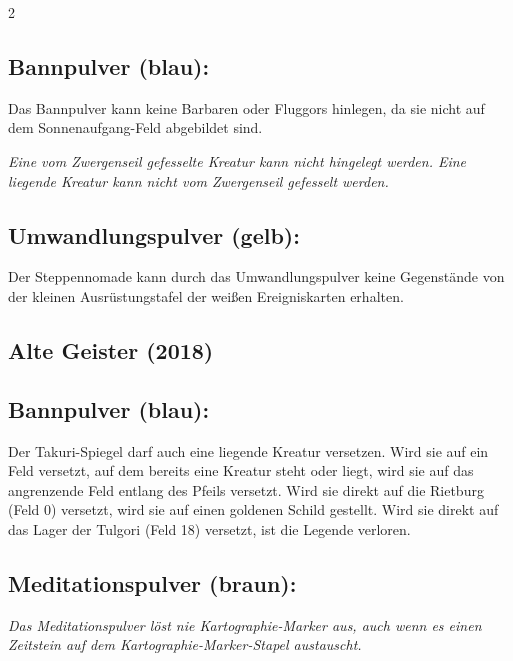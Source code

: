 \documentclass[10pt, a4paper, oneside]{book}
\newcommand{\fan}[1]{\textit{#1}}
\begin{document}
\begin{multicols*}{2}
\begin{bgcolor}[color-bb]
\subsection{Bannpulver (blau):}

Das Bannpulver kann keine Barbaren oder Fluggors hinlegen, da sie nicht auf dem Sonnenaufgang-Feld abgebildet sind.
\supercite{90058}

\fan{Eine vom Zwergenseil gefesselte Kreatur kann nicht hingelegt werden. Eine liegende Kreatur kann nicht vom Zwergenseil gefesselt werden.}


\subsection{Umwandlungspulver (gelb):}

Der Steppennomade kann durch das Umwandlungspulver keine Gegenstände von der kleinen Ausrüstungstafel der weißen Ereigniskarten erhalten.
\supercite{88659}

\end{bgcolor}



\begin{bgcolor}[color-ag]
\section{Alte Geister (2018)}




\subsection{Bannpulver (blau):}

Der Takuri-Spiegel darf auch eine liegende Kreatur versetzen. Wird sie auf ein Feld versetzt, auf dem bereits eine Kreatur steht oder liegt, wird sie auf das angrenzende Feld entlang des Pfeils versetzt. Wird sie direkt auf die Rietburg (Feld 0) versetzt, wird sie auf einen goldenen Schild gestellt. Wird sie direkt auf das Lager der Tulgori (Feld 18) versetzt, ist die Legende verloren.
\supercite{ag-begleitheft}



\subsection{Meditationspulver (braun):}

\fan{Das Meditationspulver löst nie Kartographie-Marker aus, auch wenn es einen Zeitstein auf dem Kartographie-Marker-Stapel austauscht.}



\end{bgcolor}
\end{multicols*}
\end{document}
